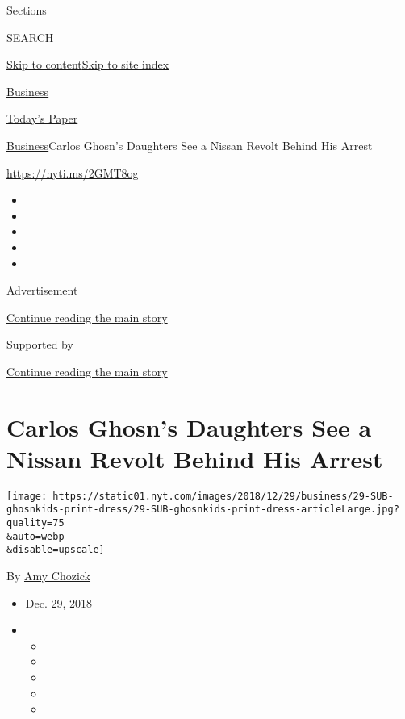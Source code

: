 Sections

SEARCH

\protect\hyperlink{site-content}{Skip to
content}\protect\hyperlink{site-index}{Skip to site index}

\href{https://www.nytimes.com/section/business}{Business}

\href{https://myaccount.nytimes.com/auth/login?response_type=cookie\&client_id=vi}{}

\href{https://www.nytimes.com/section/todayspaper}{Today's Paper}

\href{/section/business}{Business}\textbar{}Carlos Ghosn's Daughters See
a Nissan Revolt Behind His Arrest

\url{https://nyti.ms/2GMT8og}

\begin{itemize}
\item
\item
\item
\item
\item
\end{itemize}

Advertisement

\protect\hyperlink{after-top}{Continue reading the main story}

Supported by

\protect\hyperlink{after-sponsor}{Continue reading the main story}

\hypertarget{carlos-ghosns-daughters-see-a-nissan-revolt-behind-his-arrest}{%
\section{Carlos Ghosn's Daughters See a Nissan Revolt Behind His
Arrest}\label{carlos-ghosns-daughters-see-a-nissan-revolt-behind-his-arrest}}

\texttt{[image: https://static01.nyt.com/images/2018/12/29/business/29-SUB-ghosnkids-print-dress/29-SUB-ghosnkids-print-dress-articleLarge.jpg?quality=75\\\&auto=webp\\\&disable=upscale]}

By \href{https://www.nytimes.com/by/amy-chozick}{Amy Chozick}

\begin{itemize}
\item
  Dec. 29, 2018
\item
  \begin{itemize}
  \item
  \item
  \item
  \item
  \item
  \end{itemize}
\end{itemize}

